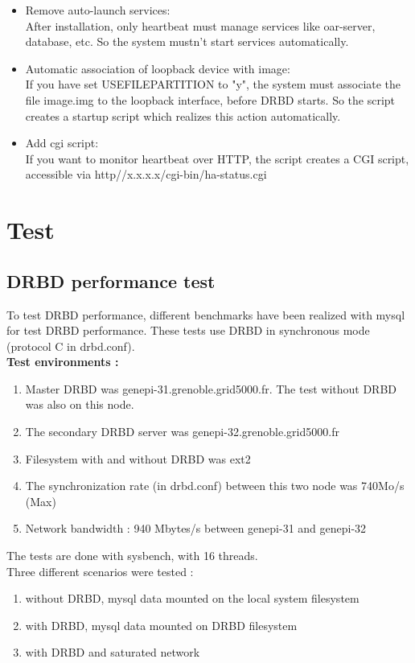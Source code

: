 \documentclass[a4paper,10pt]{report}
\begin{document}
\begin{itemize}
 \item Remove auto-launch services:\\
After installation, only heartbeat must manage services like oar-server, database, etc. So the system mustn't start services automatically.
 \item Automatic association of loopback device with image:\\
If you have set USEFILEPARTITION to "y", the system must associate the file image.img to the loopback interface, before DRBD starts. So the script creates a startup script which realizes this action automatically.
 \item Add cgi script:\\
If you want to monitor heartbeat over HTTP, the script creates a CGI script, accessible via http//x.x.x.x/cgi-bin/ha-status.cgi
\end{itemize}





\chapter{Test}

\section{DRBD performance test}

To test DRBD performance, different benchmarks have been realized with mysql for test DRBD performance. These tests use DRBD in synchronous mode (protocol C in drbd.conf).\\
\textbf{Test environments :}
\begin{enumerate}
 \item Master DRBD was genepi-31.grenoble.grid5000.fr. The test without DRBD was also on this node.
 \item The secondary DRBD server was genepi-32.grenoble.grid5000.fr 
 \item Filesystem with and without DRBD was ext2
 \item The synchronization rate (in drbd.conf) between this two node was 740Mo/s (Max)
 \item Network bandwidth : 940 Mbytes/s between genepi-31 and genepi-32
\end{enumerate}
The tests are done with sysbench, with 16 threads.\\

Three different scenarios were tested :
\begin{enumerate}
 \item without DRBD, mysql data mounted on the local system filesystem 
 \item with DRBD, mysql data mounted on DRBD filesystem 
 \item with DRBD and saturated network 
\end{enumerate}
\end{document}
